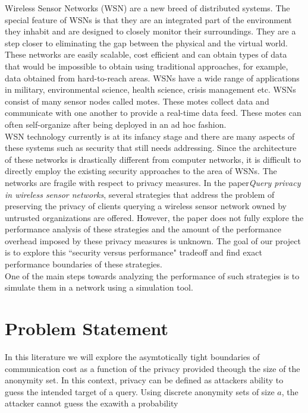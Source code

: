 \documentclass[12pt]{report}
\begin{document}
Wireless Sensor Networks (WSN) are a new breed of distributed systems. The special feature of WSNs is that they are an integrated part of the environment they inhabit and are designed to closely monitor their surroundings. They are a step closer to eliminating the gap between the physical and the virtual world. These networks are easily scalable, cost efficient and can obtain types of data that would be impossible to obtain using traditional approaches, for example, data obtained from hard-to-reach areas. WSNs have a wide range of applications in military, environmental science, health science, crisis management etc. WSNs consist of many sensor nodes called motes. These motes collect data and communicate with one another to provide a real-time data feed. These motes can often self-organize after being deployed in an ad hoc fashion\cite{wsn1}. \\ 
WSN technology currently is at its infancy stage and there are many aspects of these systems such as security that still needs addressing. Since the architecture of these networks is drastically different from computer networks, it is difficult to directly employ the existing security approaches to the area of WSNs. The networks are fragile with respect to privacy measures. In the paper{\it Query privacy in wireless sensor networks}\cite{mainppr}, several strategies that address the problem of preserving the privacy of clients querying a wireless sensor network owned by untrusted organizations are offered. However, the paper does not fully explore the performance analysis of these strategies and the amount of the performance overhead imposed by these privacy measures is unknown. The goal of our project is to explore this ``security versus performance" tradeoff and find exact performance boundaries of these strategies.\\ 
One of the main steps towards analyzing the performance of such strategies is to simulate them in a network using a simulation tool.
 
 



\section{Problem Statement}

In this literature we will explore the asymtotically tight boundaries of communication cost as a function of the privacy provided theough the size of the anonymity set. In this context, privacy can be defined as attackers ability to guess the intended target of a query. Using discrete anonymity sets of size $a$, the attacker cannot guess the exawith a probability 
\end{document}
